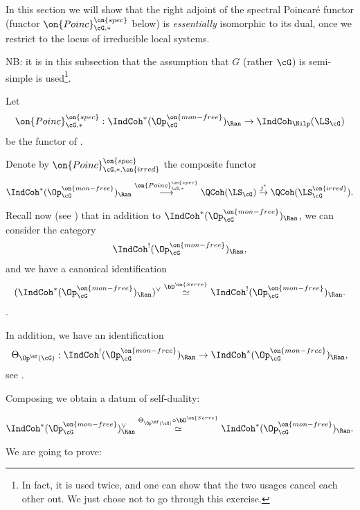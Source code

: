 \documentclass[9pt]{amsart}
\theoremstyle{remark}
\theoremstyle{definition}
\theoremstyle{remark}
\numberwithin{equation}{section}
\begin{document}

In this section we will show that the right adjoint of the spectral Poincar\'e functor (functor $\on{Poinc}^{\on{spec}}_{\cG,*}$ below)
is \emph{essentially} isomorphic to its dual, once we restrict to the locus of irreducible local systems. 

\medskip

\noindent NB: it is in this subsection that the assumption that $G$ (rather $\cG$) is semi-simple is 
used\footnote{In fact, it is used twice, and one can show that the two usages cancel each other out. We just chose
not to go through this exercise.}.  

\sssec{}

Let 
$$\on{Poinc}^{\on{spec}}_{\cG,*}:\IndCoh^*(\Op^{\on{mon-free}}_\cG)_\Ran\to \IndCoh_\Nilp(\LS_\cG)$$
be the functor of \cite[Sect. 17.4.2]{GLC2}.

\medskip

Denote by $\on{Poinc}^{\on{spec}}_{\cG,*,\on{irred}}$ the composite functor
$$\IndCoh^*(\Op^{\on{mon-free}}_\cG)_\Ran \overset{\on{Poinc}^{\on{spec}}_{\cG,*}}\longrightarrow 
\QCoh(\LS_\cG) \overset{\jmath^*}\to \QCoh(\LS^{\on{irred}}_\cG).$$

\sssec{}

Recall now (see \cite[Sect. 3.2]{GLC2}) that in addition to $\IndCoh^*(\Op^{\on{mon-free}}_\cG)_\Ran$, we can consider the category 
$$\IndCoh^!(\Op^{\on{mon-free}}_\cG)_\Ran,$$
and we have a canonical identification
\begin{equation} \label{e:IndCoh mon-free duality}
(\IndCoh^*(\Op^{\on{mon-free}}_\cG)_\Ran)^\vee \overset{\bD^{\on{Serre}}}\simeq \IndCoh^!(\Op^{\on{mon-free}}_\cG)_\Ran.
\end{equation}. 

In addition, we have an identification
$$\Theta_{\Op^\mf(\cG)}:\IndCoh^!(\Op^{\on{mon-free}}_\cG)_\Ran\to \IndCoh^*(\Op^{\on{mon-free}}_\cG)_\Ran,$$
see \cite[Equation (3.21)]{GLC2}.

\medskip

Composing we obtain a datum of self-duality:

\begin{equation} \label{e:opers self-dual}
\IndCoh^*(\Op^{\on{mon-free}}_\cG)_\Ran^\vee \overset{\Theta_{\Op^\mf(\cG)}\circ \bD^{\on{Serre}}}\simeq 
\IndCoh^*(\Op^{\on{mon-free}}_\cG)_\Ran.
\end{equation}

\sssec{}

We are going to prove: 
\end{document}
